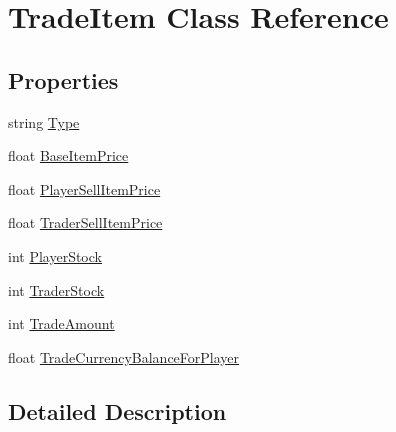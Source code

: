 \hypertarget{class_trade_item}{}\section{Trade\+Item Class Reference}
\label{class_trade_item}
\subsection*{Properties}
\begin{DoxyCompactItemize}
\item 
string \hyperlink{class_trade_item_ad1d3d942ffdbb35cbc2dbc84cd3a1a69}{Type}
\item 
float \hyperlink{class_trade_item_a02ba6ac15ffffba93012adde8b7356f4}{Base\+Item\+Price}
\item 
float \hyperlink{class_trade_item_af53537c27ca244178b97c82552af82a3}{Player\+Sell\+Item\+Price}
\item 
float \hyperlink{class_trade_item_a3b737579120d98f8a74356234ebaec54}{Trader\+Sell\+Item\+Price}
\item 
int \hyperlink{class_trade_item_ae76535175fe476d67f46e3c3246c3716}{Player\+Stock}
\item 
int \hyperlink{class_trade_item_ab737656a53086a552dc8a9fa1b48f109}{Trader\+Stock}
\item 
int \hyperlink{class_trade_item_a0e72a2552f0018c7c609dfc70ac2b5fa}{Trade\+Amount}
\item 
float \hyperlink{class_trade_item_a33b8ad11cd9f9589aee8bcd291940ae9}{Trade\+Currency\+Balance\+For\+Player}
\end{DoxyCompactItemize}


\subsection{Detailed Description}


